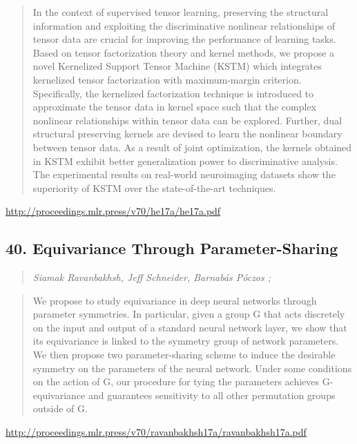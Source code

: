 \documentclass{article}
\begin{document}
\begin{quote}
    In the context of supervised tensor learning, preserving the structural information and exploiting the discriminative nonlinear relationships of tensor data are crucial for improving the performance of learning tasks. Based on tensor factorization theory and kernel methods, we propose a novel Kernelized Support Tensor Machine (KSTM) which integrates kernelized tensor factorization with maximum-margin criterion. Specifically, the kernelized factorization technique is introduced to approximate the tensor data in kernel space such that the complex nonlinear relationships within tensor data can be explored. Further, dual structural preserving kernels are devised to learn the nonlinear boundary between tensor data. As a result of joint optimization, the kernels obtained in KSTM exhibit better generalization power to discriminative analysis. The experimental results on real-world neuroimaging datasets show the superiority of KSTM over the state-of-the-art techniques.  \end{quote}

\href{http://proceedings.mlr.press/v70/he17a/he17a.pdf}{http://proceedings.mlr.press/v70/he17a/he17a.pdf}

\subsection{40. Equivariance Through Parameter-Sharing}

\begin{quote}
\footnotesize{\textit{Siamak Ravanbakhsh, Jeff Schneider, Barnabás Póczos ;}}
\end{quote}

\begin{quote}
    We propose to study equivariance in deep neural networks through parameter symmetries. In particular, given a group G that acts discretely on the input and output of a standard neural network layer, we show that its equivariance is linked to the symmetry group of network parameters. We then propose two parameter-sharing scheme to induce the desirable symmetry on the parameters of the neural network. Under some conditions on the action of G, our procedure for tying the parameters achieves G-equivariance and guarantees sensitivity to all other permutation groups outside of G.  \end{quote}

\href{http://proceedings.mlr.press/v70/ravanbakhsh17a/ravanbakhsh17a.pdf}{http://proceedings.mlr.press/v70/ravanbakhsh17a/ravanbakhsh17a.pdf}
\end{document}
